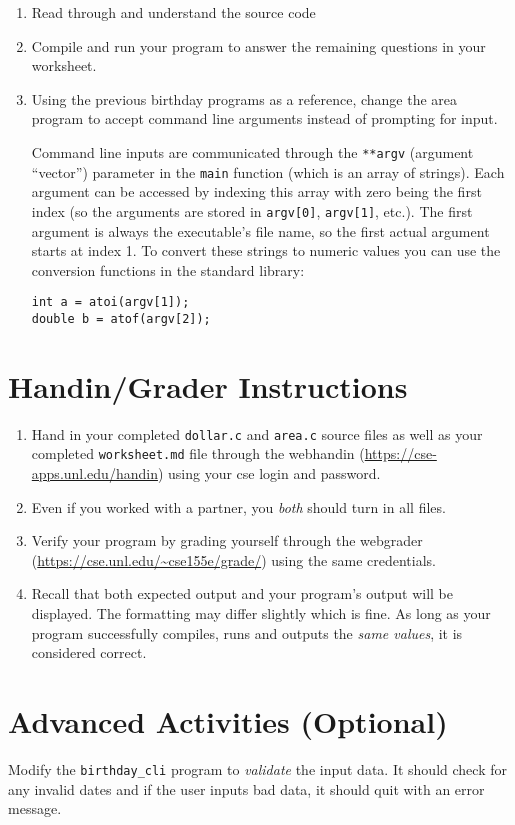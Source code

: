 \documentclass[12pt]{scrartcl}
\begin{document}
\begin{enumerate}
  \item Read through and understand the source code
  \item Compile and run your program to answer the remaining questions
  	in your worksheet.
  \item Using the previous birthday programs as a reference, change the
  	area program to accept command line arguments instead of prompting
	for input.
	
	Command line inputs are communicated through the 
	\texttt{**argv} (argument ``vector'') parameter in
	the \texttt{main} function (which is an array of strings).
	Each argument can be accessed by indexing this array with zero 
	being the first index (so the arguments are stored in 
	\texttt{argv[0]}, \texttt{argv[1]}, etc.).  
	The first argument is always the executable's
	file name, so the first actual argument starts at index 1.  
	To convert these strings to numeric values you can use the 
	conversion functions in the standard library:

\begin{verbatim}
int a = atoi(argv[1]);
double b = atof(argv[2]);
\end{verbatim}


\end{enumerate}

\section{Handin/Grader Instructions}

\begin{enumerate}
  \item Hand in your completed \texttt{dollar.c} and 
  \texttt{area.c} source files as well as your completed
  \texttt{worksheet.md} file through the webhandin
  (\url{https://cse-apps.unl.edu/handin}) using your cse login
  and password.  
  \item Even if you worked with a partner, you \emph{both} should
  turn in all files.
  \item Verify your program by grading yourself through the
  webgrader (\url{https://cse.unl.edu/~cse155e/grade/}) using the
  same credentials.
  \item Recall that both expected output and your program's output
  will be displayed.  The formatting may differ slightly which is fine.
  As long as your program successfully compiles, runs and outputs 
  the \emph{same values}, it is considered correct.
\end{enumerate}

\section{Advanced Activities (Optional)}

Modify the \texttt{birthday_cli} program to
\emph{validate} the input data.  It should check for any
invalid dates and if the user inputs bad data, it should
quit with an error message.
\end{document}
